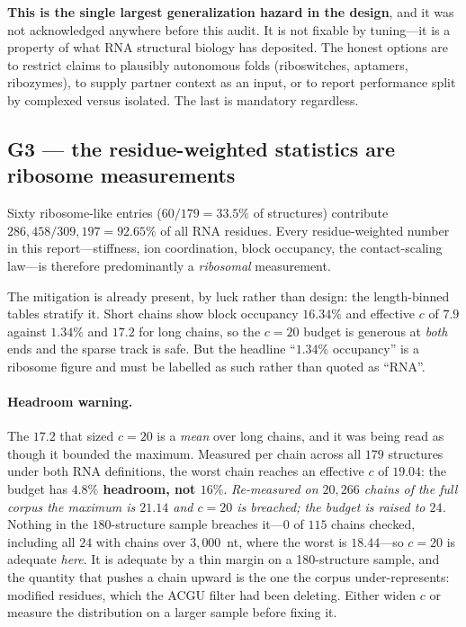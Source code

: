 \documentclass[11pt,a4paper]{article}
\begin{document}
\textcolor{risk}{\textbf{This is the single largest generalization hazard in the
design}}, and it was not acknowledged anywhere before this audit. It is not
fixable by tuning---it is a property of what RNA structural biology has
deposited. The honest options are to restrict claims to plausibly autonomous
folds (riboswitches, aptamers, ribozymes), to supply partner context as an
input, or to report performance split by complexed versus isolated. The last is
mandatory regardless.

\subsection{G3 --- the residue-weighted statistics are ribosome measurements}

Sixty ribosome-like entries ($60/179 = 33.5\%$ of structures) contribute
$286{,}458/309{,}197 = \mathbf{92.65\%}$ of all RNA residues. Every
residue-weighted number in this report---stiffness, ion coordination, block
occupancy, the contact-scaling law---is therefore predominantly a
\emph{ribosomal} measurement.

The mitigation is already present, by luck rather than design: the
length-binned tables stratify it. Short chains show block occupancy $16.34\%$
and effective $c$ of $7.9$ against $1.34\%$ and $17.2$ for long chains, so the
$c=20$ budget is generous at \emph{both} ends and the sparse track is safe. But
the headline ``$1.34\%$ occupancy'' is a ribosome figure and must be labelled as
such rather than quoted as ``RNA''.

\paragraph{Headroom warning.} The $17.2$ that sized $c=20$ is a \emph{mean} over
long chains, and it was being read as though it bounded the maximum. Measured per
chain across all $179$ structures under both RNA definitions, the worst chain
reaches an effective $c$ of $\mathbf{19.04}$: the budget has
\textbf{$4.8\%$ headroom, not $16\%$}. \emph{Re-measured on $20{,}266$ chains of
the full corpus the maximum is $\mathbf{21.14}$ and $c=20$ is breached; the budget
is raised to $24$.} Nothing in the $180$-structure sample breaches it---$0$ of
$115$ chains checked, including all $24$ with chains over $3{,}000$~nt, where the
worst is $18.44$---so $c=20$ is adequate \emph{here}. It is adequate by a thin
margin on a 180-structure sample, and the quantity that pushes a chain upward is
the one the corpus under-represents: modified residues, which the ACGU filter had
been deleting. Either widen $c$ or measure the distribution on a larger sample
before fixing it.
\end{document}
